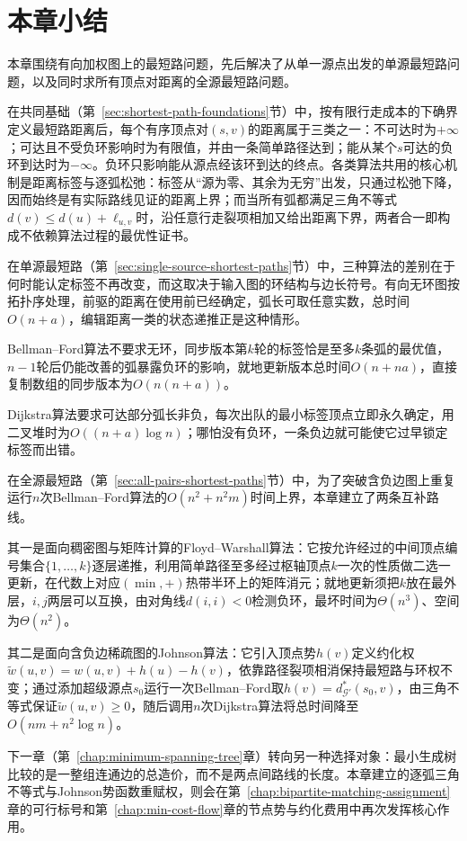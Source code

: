 \FloatBarrier
\section{本章小结}
\label{sec:graph-opt-sp-summary}
\label{sec:shortest-paths-summary}
\label{sec:apsp-summary}

本章围绕有向加权图上的最短路问题，先后解决了从单一源点出发的单源最短路问题，以及同时求所有顶点对距离的全源最短路问题。

在共同基础（第~\ref{sec:shortest-path-foundations}节）中，按有限行走成本的下确界定义最短路距离后，每个有序顶点对$(s,v)$的距离属于三类之一：不可达时为$+\infty$；可达且不受负环影响时为有限值，并由一条简单路径达到；能从某个$s$可达的负环到达时为$-\infty$。负环只影响能从源点经该环到达的终点。各类算法共用的核心机制是距离标签与逐弧松弛：标签从“源为零、其余为无穷”出发，只通过松弛下降，因而始终是有实际路线见证的距离上界；而当所有弧都满足三角不等式$d(v)\leq d(u)+\ell_{u,v}$时，沿任意行走裂项相加又给出距离下界，两者合一即构成不依赖算法过程的最优性证书。

在单源最短路（第~\ref{sec:single-source-shortest-paths}节）中，三种算法的差别在于何时能认定标签不再改变，而这取决于输入图的环结构与边长符号。有向无环图按拓扑序处理，前驱的距离在使用前已经确定，弧长可取任意实数，总时间$O(n+a)$，编辑距离一类的状态递推正是这种情形。

Bellman--Ford算法不要求无环，同步版本第$k$轮的标签恰是至多$k$条弧的最优值，$n-1$轮后仍能改善的弧暴露负环的影响，就地更新版本总时间$O(n+na)$，直接复制数组的同步版本为$O(n(n+a))$。

Dijkstra算法要求可达部分弧长非负，每次出队的最小标签顶点立即永久确定，用二叉堆时为$O((n+a)\log n)$；哪怕没有负环，一条负边就可能使它过早锁定标签而出错。

在全源最短路（第~\ref{sec:all-pairs-shortest-paths}节）中，为了突破含负边图上重复运行$n$次Bellman--Ford算法的$O(n^2+n^2m)$时间上界，本章建立了两条互补路线。

其一是面向稠密图与矩阵计算的Floyd--Warshall算法：它按允许经过的中间顶点编号集合$\{1,\ldots,k\}$逐层递推，利用简单路径至多经过枢轴顶点$k$一次的性质做二选一更新，在代数上对应$(\min,+)$热带半环上的矩阵消元；就地更新须把$k$放在最外层，$i,j$两层可以互换，由对角线$d(i,i)<0$检测负环，最坏时间为$\Theta(n^3)$、空间为$\Theta(n^2)$。

其二是面向含负边稀疏图的Johnson算法：它引入顶点势$h(v)$定义约化权$\tilde w(u,v)=w(u,v)+h(u)-h(v)$，依靠路径裂项相消保持最短路与环权不变；通过添加超级源点$s_0$运行一次Bellman--Ford取$h(v)=d^*_{\mathcal G'}(s_0,v)$，由三角不等式保证$\tilde w(u,v)\geq0$，随后调用$n$次Dijkstra算法将总时间降至$O(nm+n^2\log n)$。

下一章（第~\ref{chap:minimum-spanning-tree}章）转向另一种选择对象：最小生成树比较的是一整组连通边的总造价，而不是两点间路线的长度。本章建立的逐弧三角不等式与Johnson势函数重赋权，则会在第~\ref{chap:bipartite-matching-assignment}章的可行标号和第~\ref{chap:min-cost-flow}章的节点势与约化费用中再次发挥核心作用。

